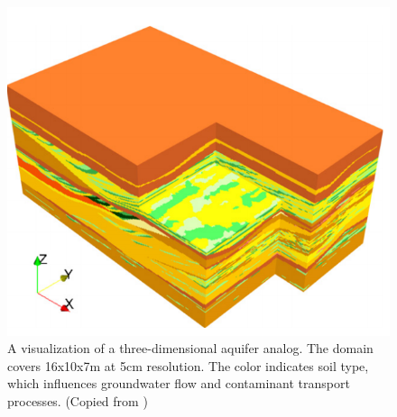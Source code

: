 \begin{figure}[!ht]
   \centering
   \includegraphics{./fig/herten.png} %
   \caption{A visualization of a three-dimensional aquifer analog. The domain covers 16x10x7m at 5cm resolution. The color indicates soil type, which influences groundwater flow and contaminant transport processes. (Copied from \cite{Comunian2011a})}
   \label{fig:herten}
\end{figure}


